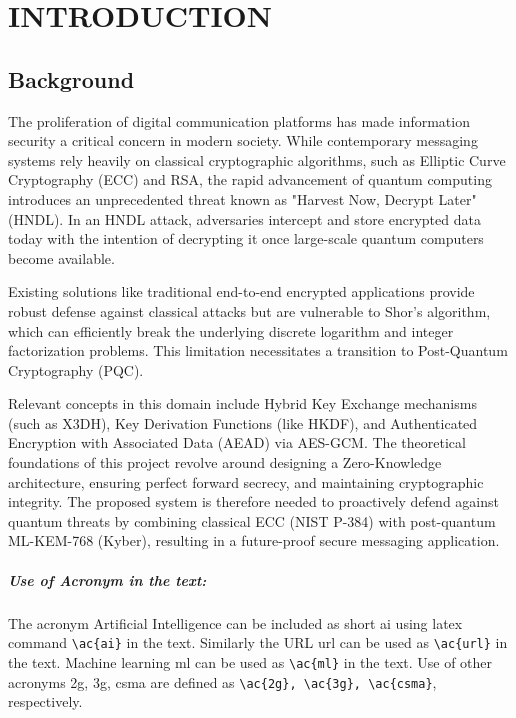 \chapter{\MakeUppercase{Introduction}}
\justifying
\section{Background}
The proliferation of digital communication platforms has made information security a critical concern in modern society. While contemporary messaging systems rely heavily on classical cryptographic algorithms, such as Elliptic Curve Cryptography (ECC) and RSA, the rapid advancement of quantum computing introduces an unprecedented threat known as "Harvest Now, Decrypt Later" (HNDL). In an HNDL attack, adversaries intercept and store encrypted data today with the intention of decrypting it once large-scale quantum computers become available. 

Existing solutions like traditional end-to-end encrypted applications provide robust defense against classical attacks but are vulnerable to Shor's algorithm, which can efficiently break the underlying discrete logarithm and integer factorization problems. This limitation necessitates a transition to Post-Quantum Cryptography (PQC). 

Relevant concepts in this domain include Hybrid Key Exchange mechanisms (such as X3DH), Key Derivation Functions (like HKDF), and Authenticated Encryption with Associated Data (AEAD) via AES-GCM. The theoretical foundations of this project revolve around designing a Zero-Knowledge architecture, ensuring perfect forward secrecy, and maintaining cryptographic integrity. The proposed system is therefore needed to proactively defend against quantum threats by combining classical ECC (NIST P-384) with post-quantum ML-KEM-768 (Kyber), resulting in a future-proof secure messaging application.

\paragraph{Use of Acronym in the text:}The acronym Artificial Intelligence can be included as short \ac{ai} using latex command \verb|\ac{ai}|  in the text. Similarly the URL \ac{url} can be used as \verb|\ac{url}| in the text. Machine learning \ac{ml} can be used as \verb|\ac{ml}| in the text. Use of other acronyms \ac{2g}, \ac{3g}, \ac{csma} are  defined as \verb|\ac{2g}, \ac{3g}, \ac{csma}|, respectively.

